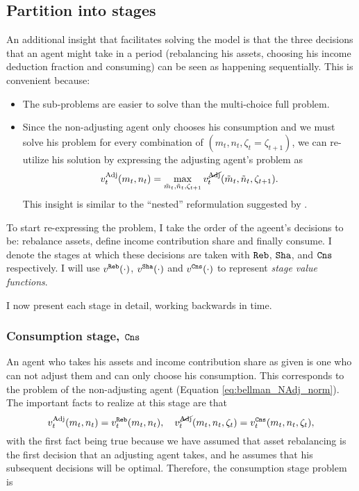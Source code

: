 \documentclass[./RiskyContrib.tex]{subfiles}
\begin{document}
\subsection{Partition into stages}

An additional insight that facilitates solving the model is that the three decisions
that an agent might take in a period (rebalancing his assets, choosing his income
deduction fraction and consuming) can be seen as happening sequentially. This is
convenient because:
\begin{itemize}
\item The sub-problems are easier to solve than the multi-choice full problem.
\item Since the non-adjusting agent only chooses his consumption and we must
solve his problem for every combination of $(m_t, n_t, \zeta_t=\zeta_{t+1})$, we can re-utilize
his solution by expressing the adjusting agent's  problem as
\begin{equation*}
v_t^{\text{Adj}}(m_t,n_t) = \max_{\tilde{m}_t, \tilde{n}_t, \zeta_{t+1}} v_t^{\cancel{\text{Adj}}}(\tilde{m}_t, \tilde{n}_t, \zeta_{t+1}).
\end{equation*}
This insight is similar to the ``nested'' reformulation suggested by \cite{Druedahl2020compecon}.
\end{itemize}

To start re-expressing the problem, I take the order of the ageent's decisions to be:
rebalance assets, define income contribution share and finally consume. I denote the stages
at which these decisions are taken with $\mathtt{Reb}$, $\mathtt{Sha}$, and $\mathtt{Cns}$ respectively. I will use
$v^{\mathtt{Reb}}(\cdot)$, $v^{\mathtt{Sha}}(\cdot)$ and $v^{\mathtt{Cns}}(\cdot)$ to represent
\emph{stage value functions}.

I now present each stage in detail, working backwards in time.

\subsubsection{Consumption stage, $\mathtt{Cns}$}

An agent who takes his assets and income contribution share as given is one who
can not adjust them and can only choose his consumption. This corresponds to the
problem of the non-adjusting agent (Equation \ref{eq:bellman_NAdj_norm}). The
important facts to realize at this stage are that
\begin{equation*}
v_t^{\text{Adj}}(m_t, n_t) = v_t^{\mathtt{Reb}}(m_t, n_t), \quad v_t^{\cancel{\text{Adj}}}(m_t, n_t, \zeta_t) = v_t^{\mathtt{Cns}}(m_t, n_t, \zeta_t),
\end{equation*}
with the first fact being true because we have assumed that asset rebalancing
is the first decision that an adjusting agent takes, and he assumes that his
subsequent decisions will be optimal. Therefore, the consumption stage problem is
\begin{equation}\label{eq:bellman_cns}

\end{equation}
\end{document}
